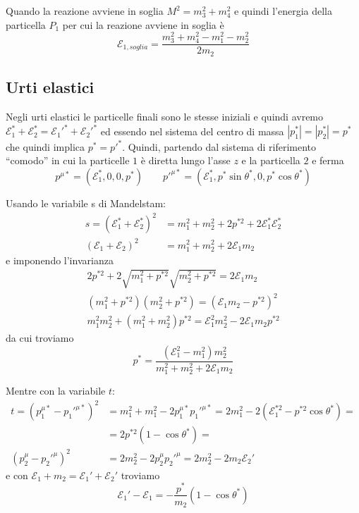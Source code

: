 \documentclass[12pt,a4paper,titlepage, twoside, openright]{book}
\numberwithin{equation}{chapter}
\begin{document}
Quando la reazione avviene in soglia $M^2=m_3^2+m_4^2$ e quindi l'energia della particella $P_1$ per cui la reazione avviene in soglia è 
\[
\mathcal{E}_{1,soglia}=\dfrac{m_3^2+m_4^2-m_1^2-m_2^2}{2m_2}
\]

\subsection{Urti elastici}

Negli urti elastici le particelle finali sono le stesse iniziali e quindi avremo $\mathcal{E}_1^{*}+\mathcal{E}_2^*=\mathcal{E}_1'^{*}+\mathcal{E}_2'^{*}$ ed essendo nel sistema del centro di massa $|p_1^*|=|p_2^*|=p^*$ che quindi implica $p^*=p'^{*}$. Quindi, partendo dal sistema di riferimento ``comodo'' in cui la particelle $1$ è diretta lungo l'asse $z$ e la particella $2$ e ferma
\[
p^{\mu *}=\left(\mathcal{E}_1^*,0,0,p^*\right) \qquad p'^{\mu*}=\left(\mathcal{E}_1^*,p^*\sin{\theta^*},0,p^*\cos{\theta^*} \right)
\] 

Usando le variabile s di Mandelstam:
\begin{align*}
s=\left(\mathcal{E}_1^*+\mathcal{E}_2^*\right)^2 &= m_1^2+m_2^2+2p^{*2}+2\mathcal{E}_1^*\mathcal{E}_2^* \\
\left(\mathcal{E}_1+\mathcal{E}_2\right)^2&= m_1^2+m_2^2+2\mathcal{E}_1m_2
\end{align*}
e imponendo l'invarianza
\begin{align*}
2p^{*2}+2\sqrt{m_1^2+p^{*2} }\sqrt{m_2^2+p^{*2}} = 2\mathcal{E}_1m_2 \\ 
(m_1^2+p^{*2} )(m_2^2+p^{*2}) = (\mathcal{E}_1m_2 - p^{*2} )^2 \\
m_1^2m_2^2 + (m_1^2+m_2^2)p^{*2} = \mathcal{E}_1^2m_2^2 -2\mathcal{E}_1m_2p^{*2}
\end{align*}
da cui troviamo
\begin{equation}\label{eqMomentoUrtoElastico}
p^*=\dfrac{(\mathcal{E}_1^2-m_1^2)m_2^2}{m_1^2+m_2^2+2\mathcal{E}_1m_2}
\end{equation}

Mentre con la variabile $t$:
 \begin{align*}
t=\left( p_1^{\mu*}-p_1'^{\mu*} \right)^2 &= m_1^2+m_1^2-2p_1^{\mu*}p_1'^{\mu*} =
 2m_1^2 -2\left( \mathcal{E}_1^{*2}-p^{*2}\cos{\theta^*} \right) =\\ &= 2p^{*2}(1 -\cos{\theta^*} )= \\
 \left( p_2^{\mu}-p_2'^{\mu} \right)^2 &= 2m_2^2 -2p_2^{\mu}p_2'^{\mu}=2m_2^2-2m_2\mathcal{E}_2'
\end{align*}
e con $\mathcal{E}_1+m_2=\mathcal{E}_1'+\mathcal{E}_2'$ troviamo
\begin{equation}
\mathcal{E}_1'-\mathcal{E}_1=-\dfrac{p^*}{m_2}(1-\cos{\theta^*})
\end{equation}
\end{document}
